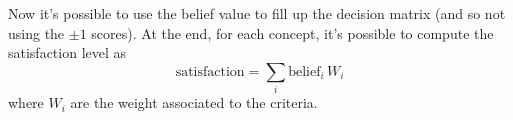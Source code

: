 		Now it's possible to use the belief value to fill up the decision matrix (and so not using the $\pm 1$ scores). At the end, for each concept, it's possible to compute the satisfaction level as
		\[\textrm{satisfaction} = \sum_i \textrm{belief}_i \, W_i \]
		where $W_i$ are the weight associated to the criteria.
		
		
		
		
		
		
		
		
		
		
		
		
		
		
		
		
		
		
		
		
		
		
		
		
		
		
	
